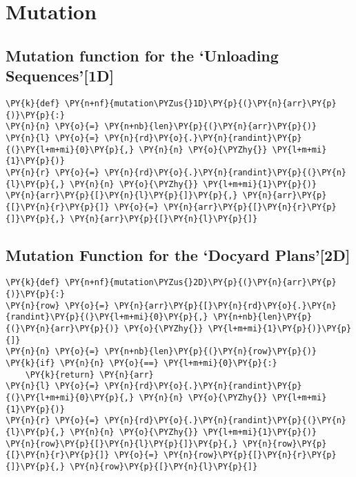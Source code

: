 \section*{Mutation}\label{mutation}

\subsection*{Mutation function for the `Unloading
Sequences'{[}1D{]}}\label{mutation-function-for-the-unloading-sequences1d}

\begin{tcolorbox}[breakable, size=fbox, boxrule=1pt, pad at break*=1mm,colback=cellbackground, colframe=cellborder]
\begin{Verbatim}[commandchars=\\\{\}]
\PY{k}{def} \PY{n+nf}{mutation\PYZus{}1D}\PY{p}{(}\PY{n}{arr}\PY{p}{)}\PY{p}{:}
\PY{n}{n} \PY{o}{=} \PY{n+nb}{len}\PY{p}{(}\PY{n}{arr}\PY{p}{)}
\PY{n}{l} \PY{o}{=} \PY{n}{rd}\PY{o}{.}\PY{n}{randint}\PY{p}{(}\PY{l+m+mi}{0}\PY{p}{,} \PY{n}{n} \PY{o}{\PYZhy{}} \PY{l+m+mi}{1}\PY{p}{)}
\PY{n}{r} \PY{o}{=} \PY{n}{rd}\PY{o}{.}\PY{n}{randint}\PY{p}{(}\PY{n}{l}\PY{p}{,} \PY{n}{n} \PY{o}{\PYZhy{}} \PY{l+m+mi}{1}\PY{p}{)}
\PY{n}{arr}\PY{p}{[}\PY{n}{l}\PY{p}{]}\PY{p}{,} \PY{n}{arr}\PY{p}{[}\PY{n}{r}\PY{p}{]} \PY{o}{=} \PY{n}{arr}\PY{p}{[}\PY{n}{r}\PY{p}{]}\PY{p}{,} \PY{n}{arr}\PY{p}{[}\PY{n}{l}\PY{p}{]}
\end{Verbatim}
\end{tcolorbox}

\subsection*{Mutation Function for the `Docyard
Plans'{[}2D{]}}\label{mutation-function-for-the-docyard-plans2d}

\begin{tcolorbox}[breakable, size=fbox, boxrule=1pt, pad at break*=1mm,colback=cellbackground, colframe=cellborder]
\begin{Verbatim}[commandchars=\\\{\}]
\PY{k}{def} \PY{n+nf}{mutation\PYZus{}2D}\PY{p}{(}\PY{n}{arr}\PY{p}{)}\PY{p}{:}
\PY{n}{row} \PY{o}{=} \PY{n}{arr}\PY{p}{[}\PY{n}{rd}\PY{o}{.}\PY{n}{randint}\PY{p}{(}\PY{l+m+mi}{0}\PY{p}{,} \PY{n+nb}{len}\PY{p}{(}\PY{n}{arr}\PY{p}{)} \PY{o}{\PYZhy{}} \PY{l+m+mi}{1}\PY{p}{)}\PY{p}{]}
\PY{n}{n} \PY{o}{=} \PY{n+nb}{len}\PY{p}{(}\PY{n}{row}\PY{p}{)}
\PY{k}{if} \PY{n}{n} \PY{o}{==} \PY{l+m+mi}{0}\PY{p}{:}
    \PY{k}{return} \PY{n}{arr}
\PY{n}{l} \PY{o}{=} \PY{n}{rd}\PY{o}{.}\PY{n}{randint}\PY{p}{(}\PY{l+m+mi}{0}\PY{p}{,} \PY{n}{n} \PY{o}{\PYZhy{}} \PY{l+m+mi}{1}\PY{p}{)}
\PY{n}{r} \PY{o}{=} \PY{n}{rd}\PY{o}{.}\PY{n}{randint}\PY{p}{(}\PY{n}{l}\PY{p}{,} \PY{n}{n} \PY{o}{\PYZhy{}} \PY{l+m+mi}{1}\PY{p}{)}
\PY{n}{row}\PY{p}{[}\PY{n}{l}\PY{p}{]}\PY{p}{,} \PY{n}{row}\PY{p}{[}\PY{n}{r}\PY{p}{]} \PY{o}{=} \PY{n}{row}\PY{p}{[}\PY{n}{r}\PY{p}{]}\PY{p}{,} \PY{n}{row}\PY{p}{[}\PY{n}{l}\PY{p}{]}
\end{Verbatim}
\end{tcolorbox}

